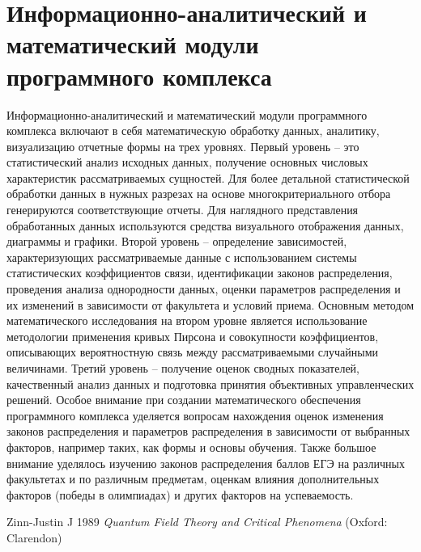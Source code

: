 \documentclass[]{article}
\begin{document}
\section{Информационно-аналитический и математический модули программного комплекса}
Информационно-аналитический и математический модули программного комплекса включают в себя математическую обработку данных, аналитику, визуализацию отчетные формы на трех уровнях. Первый уровень – это статистический анализ  исходных данных, получение основных числовых характеристик рассматриваемых сущностей.   Для более детальной статистической обработки данных в нужных разрезах на основе многокритериального отбора генерируются соответствующие отчеты. Для наглядного представления обработанных данных используются средства визуального отображения данных, диаграммы и графики.
Второй уровень – определение зависимостей, характеризующих   рассматриваемые данные с использованием системы статистических коэффициентов связи, идентификации законов распределения,  проведения анализа однородности данных, оценки параметров распределения и их изменений в зависимости от факультета и условий приема. Основным методом математического исследования на втором уровне является использование методологии применения кривых Пирсона и совокупности коэффициентов, описывающих  вероятностную связь между рассматриваемыми случайными величинами. 
Третий уровень – получение оценок сводных показателей, качественный анализ данных и подготовка принятия объективных управленческих решений.
Особое внимание при создании математического обеспечения программного комплекса уделяется вопросам нахождения оценок изменения законов распределения и параметров распределения в зависимости от выбранных факторов, например таких, как формы  и основы обучения. Также большое внимание уделялось изучению законов  распределения баллов ЕГЭ на различных факультетах и по различным предметам, оценкам влияния дополнительных факторов (победы в олимпиадах) и других факторов  на успеваемость.
\newpage
\begin{thebibliography}{99}

 Zinn-Justin J 1989 {\it Quantum Field Theory and Critical
Phenomena} (Oxford: Clarendon)

\end{thebibliography}
\end{document}
